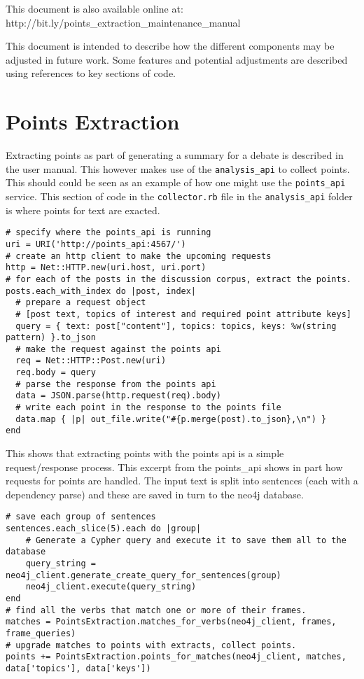 This document is also available online at: \\ http://bit.ly/points\_extraction\_maintenance\_manual

\noindent\hrulefill

\noindent This document is intended to describe how the different components may
be adjusted in future work. Some features and potential adjustments are
described using references to key sections of code.

\section{Points Extraction}

Extracting points as part of generating a summary for a debate is
described in the user manual. This however makes use of the
\texttt{analysis\_api} to collect points. This should could be seen as
an example of how one might use the \texttt{points\_api} service. This
section of code in the \texttt{collector.rb} file in the
\texttt{analysis\_api} folder is where points for text are exacted.

\begin{verbatim}
# specify where the points_api is running
uri = URI('http://points_api:4567/')
# create an http client to make the upcoming requests
http = Net::HTTP.new(uri.host, uri.port)
# for each of the posts in the discussion corpus, extract the points.
posts.each_with_index do |post, index|
  # prepare a request object
  # [post text, topics of interest and required point attribute keys]
  query = { text: post["content"], topics: topics, keys: %w(string pattern) }.to_json
  # make the request against the points api
  req = Net::HTTP::Post.new(uri)
  req.body = query
  # parse the response from the points api
  data = JSON.parse(http.request(req).body)
  # write each point in the response to the points file
  data.map { |p| out_file.write("#{p.merge(post).to_json},\n") }
end
\end{verbatim}

This shows that extracting points with the points api is a simple
request/response process. This excerpt from the points\_api shows in
part how requests for points are handled. The input text is split into
sentences (each with a dependency parse) and these are saved in turn to
the neo4j database.

\begin{verbatim}
# save each group of sentences
sentences.each_slice(5).each do |group|
    # Generate a Cypher query and execute it to save them all to the database
    query_string = neo4j_client.generate_create_query_for_sentences(group)
    neo4j_client.execute(query_string)
end
# find all the verbs that match one or more of their frames.
matches = PointsExtraction.matches_for_verbs(neo4j_client, frames, frame_queries)
# upgrade matches to points with extracts, collect points.
points += PointsExtraction.points_for_matches(neo4j_client, matches, data['topics'], data['keys'])
\end{verbatim}

